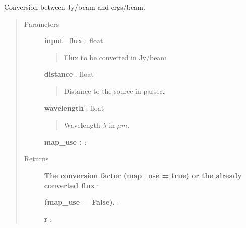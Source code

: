 \documentclass[a4paper,10pt,english]{sphinxmanual}
\begin{document}
\begin{fulllineitems}
\label{functions:astrolyze.functions.units.JyBToErgsB}
Conversion between Jy/beam and ergs/beam.
\begin{quote}\begin{description}
\item[{Parameters }] \leavevmode
\textbf{input\_flux} : float
\begin{quote}

Flux to be converted in Jy/beam
\end{quote}

\textbf{distance} : float
\begin{quote}

Distance to the source in parsec.
\end{quote}

\textbf{wavelength} : float
\begin{quote}

Wavelength $\lambda$ in $\mu m$.
\end{quote}

\textbf{map\_use :} :

\item[{Returns }] \leavevmode
\textbf{The conversion factor (map\_use = true) or the already converted flux} :

\textbf{(map\_use = False).} :

\textbf{r} :

\end{description}\end{quote}

\end{fulllineitems}

\end{document}
